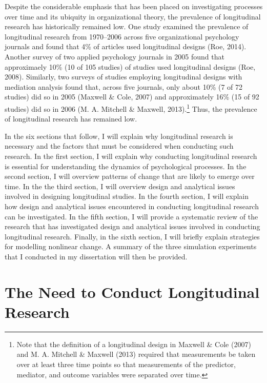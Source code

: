 \documentclass[
12pt, %
twoside,
english]{guelphthesis}
\theoremstyle{definition}
\theoremstyle{definition}
\theoremstyle{definition}
\theoremstyle{definition}
\theoremstyle{remark}
\begin{document}
Despite the considerable emphasis that has been placed on investigating processes over time and its ubiquity in organizational theory, the prevalence of longitudinal research has historically remained low. One study examined the prevalence of longitudinal research from 1970--2006 across five organizational psychology journals and found that 4\% of articles used longitudinal designs (Roe, 2014). Another survey of two applied psychology journals in 2005 found that approximaely 10\% (10 of 105 studies) of studies used longitudinal designs (Roe, 2008). Similarly, two surveys of studies employing longitudinal designs with mediation analysis found that, across five journals, only about 10\% (7 of 72 studies) did so in 2005 (Maxwell \& Cole, 2007) and approximately 16\% (15 of 92 studies) did so in 2006 (M. A. Mitchell \& Maxwell, 2013).\footnote{Note that the definition of a longitudinal design in Maxwell \& Cole (2007) and M. A. Mitchell \& Maxwell (2013) required that measurements be taken over at least three time points so that measurements of the predictor, mediator, and outcome variables were separated over time.} Thus, the prevalence of longitudinal research has remained low.

In the six sections that follow, I will explain why longitudinal research is necessary and the factors that must be considered when conducting such research. In the first section, I will explain why conducting longitudinal research is essential for understanding the dynamics of psychological processes. In the second section, I will overview patterns of change that are likely to emerge over time. In the the third section, I will overview design and analytical issues involved in designing longitudinal studies. In the fourth section, I will explain how design and analytical issues encountered in conducting longitudinal research can be investigated. In the fifth section, I will provide a systematic review of the research that has investigated design and analytical issues involved in conducting longitudinal research. Finally, in the sixth section, I will briefly explain strategies for modelling nonlinear change. A summary of the three simulation experiments that I conducted in my dissertation will then be provided.

\hypertarget{the-need-to-conduct-longitudinal-research}{%
\section{The Need to Conduct Longitudinal Research}\label{the-need-to-conduct-longitudinal-research}}
\end{document}
